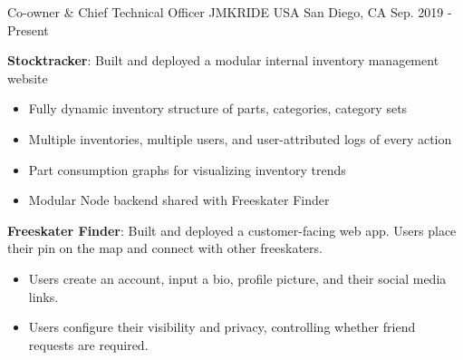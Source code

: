 \begin{cventries}
  \cventry
    {Co-owner \& Chief Technical Officer} %
    {
      \hspace{0.7em}JMKRIDE USA
    } %
    {San Diego, CA} %
    {Sep. 2019 - Present} %
    {
      \begin{cvitems} %
        \item {
          \textbf{Stocktracker}: Built and deployed a modular internal inventory management website 
          \newline{}
          \begin{itemize}[leftmargin=0.5cm]
            \item{Fully dynamic inventory structure of parts, categories, category sets}
            \item{Multiple inventories, multiple users, and user-attributed logs of every action}
            \item{Part consumption graphs for visualizing inventory trends}
            \item{Modular Node backend shared with Freeskater Finder}
          \end{itemize}
        }
        \item{
          \textbf{Freeskater Finder}: Built and deployed a customer-facing web
          app. Users place their pin on the map and connect with other
          freeskaters.
          \newline{}
          \begin{itemize}[leftmargin=0.5cm]
            \item{
              Users create an account, input a bio, profile picture, and their
              social media links.
            }
            \item{
              Users configure their visibility and privacy, controlling whether
              friend requests are required.
            }
          \end{itemize}
        }
      \end{cvitems}
    }
  

\end{cventries}
